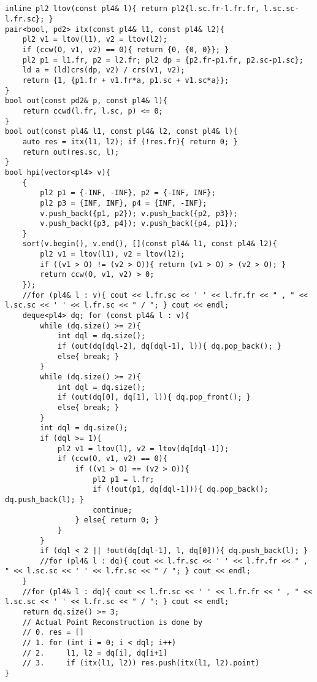 \documentclass[landscape, 8pt, a4paper, oneside, twocolumn]{extarticle}
\begin{document}
\subsection{}
\begin{verbatim}
inline pl2 ltov(const pl4& l){ return pl2{l.sc.fr-l.fr.fr, l.sc.sc-l.fr.sc}; }
pair<bool, pd2> itx(const pl4& l1, const pl4& l2){
    pl2 v1 = ltov(l1), v2 = ltov(l2);
    if (ccw(O, v1, v2) == 0){ return {0, {0, 0}}; }
    pl2 p1 = l1.fr, p2 = l2.fr; pl2 dp = {p2.fr-p1.fr, p2.sc-p1.sc};
    ld a = (ld)crs(dp, v2) / crs(v1, v2);
    return {1, {p1.fr + v1.fr*a, p1.sc + v1.sc*a}};
}
bool out(const pd2& p, const pl4& l){
    return ccwd(l.fr, l.sc, p) <= 0;
}
bool out(const pl4& l1, const pl4& l2, const pl4& l){
    auto res = itx(l1, l2); if (!res.fr){ return 0; }
    return out(res.sc, l);
}
bool hpi(vector<pl4> v){
    {
        pl2 p1 = {-INF, -INF}, p2 = {-INF, INF};
        pl2 p3 = {INF, INF}, p4 = {INF, -INF};
        v.push_back({p1, p2}); v.push_back({p2, p3});
        v.push_back({p3, p4}); v.push_back({p4, p1});
    }
    sort(v.begin(), v.end(), [](const pl4& l1, const pl4& l2){
        pl2 v1 = ltov(l1), v2 = ltov(l2);
        if ((v1 > O) != (v2 > O)){ return (v1 > O) > (v2 > O); }
        return ccw(O, v1, v2) > 0;
    });
    //for (pl4& l : v){ cout << l.fr.sc << ' ' << l.fr.fr << " , " << l.sc.sc << ' ' << l.fr.sc << " / "; } cout << endl;
    deque<pl4> dq; for (const pl4& l : v){
        while (dq.size() >= 2){
            int dql = dq.size();
            if (out(dq[dql-2], dq[dql-1], l)){ dq.pop_back(); }
            else{ break; }
        }
        while (dq.size() >= 2){
            int dql = dq.size();
            if (out(dq[0], dq[1], l)){ dq.pop_front(); }
            else{ break; }
        }
        int dql = dq.size();
        if (dql >= 1){
            pl2 v1 = ltov(l), v2 = ltov(dq[dql-1]);
            if (ccw(O, v1, v2) == 0){
                if ((v1 > O) == (v2 > O)){
                    pl2 p1 = l.fr;
                    if (!out(p1, dq[dql-1])){ dq.pop_back(); dq.push_back(l); }
                    continue;
                } else{ return 0; }
            }
        }
        if (dql < 2 || !out(dq[dql-1], l, dq[0])){ dq.push_back(l); }
        //for (pl4& l : dq){ cout << l.fr.sc << ' ' << l.fr.fr << " , " << l.sc.sc << ' ' << l.fr.sc << " / "; } cout << endl;
    }
    //for (pl4& l : dq){ cout << l.fr.sc << ' ' << l.fr.fr << " , " << l.sc.sc << ' ' << l.fr.sc << " / "; } cout << endl;
    return dq.size() >= 3;
    // Actual Point Reconstruction is done by
    // 0. res = []
    // 1. for (int i = 0; i < dql; i++)
    // 2.     l1, l2 = dq[i], dq[i+1]
    // 3.     if (itx(l1, l2)) res.push(itx(l1, l2).point)
}
\end{verbatim}
\end{document}
